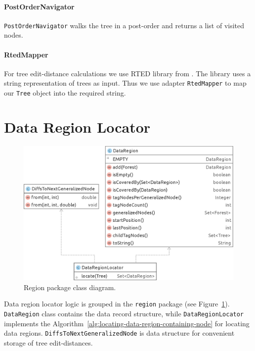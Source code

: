 \paragraph{PostOrderNavigator} \texttt{PostOrderNavigator} walks the tree in a post-order and returns a list of visited nodes.

\paragraph{RtedMapper} For tree edit-distance calculations we use RTED library from \cite{pawlik2011a}. The library uses a string representation of trees as input. Thus we use adapter \texttt{RtedMapper} to map our \texttt{Tree} object into the required string.


\section{Data Region Locator}


\begin{figure}[h]
	\centering
	\includegraphics[width=1.0\textwidth]{figures/package-region}
	\caption{Region package class diagram.}
	\label{fig:package-region}
\end{figure}

Data region locator logic is grouped in the \texttt{region} package (see Figure~\ref{fig:package-region}). \texttt{DataRegion} class contains the data record structure, while \texttt{DataRegionLocator} implements the Algorithm~\ref{alg:locating-data-region-containing-node} for locating data regions. \texttt{DiffsToNextGeneralizedNode} is data structure for convenient storage of tree edit-distances.

